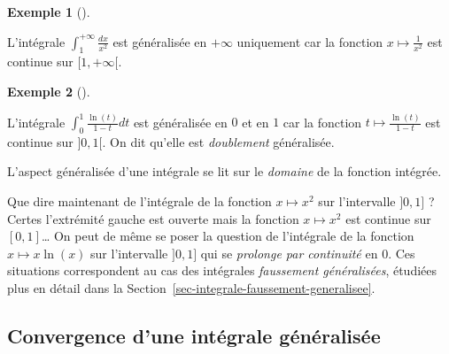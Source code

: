 \documentclass[
  french,
  letterpaper,
  DIV=11,
  numbers=noendperiod]{scrreprt}
\theoremstyle{plain}
\theoremstyle{definition}
\theoremstyle{plain}
\theoremstyle{plain}
\theoremstyle{definition}
\theoremstyle{definition}
\newtheorem{example}{Exemple}[chapter]
\theoremstyle{plain}
\theoremstyle{remark}
\begin{document}
\begin{example}[]\protect\hypertarget{exm-simplement-generalisee-1}{}\label{exm-simplement-generalisee-1}

L'intégrale \(\int_{1}^{+\infty}\frac{dx}{x^2}\) est généralisée en
\(+\infty\) uniquement car la fonction \(x \mapsto \frac{1}{x^{2}}\) est
continue sur \([1,+\infty[\).

\end{example}

\begin{example}[]\protect\hypertarget{exm-simplement-generalisee-3}{}\label{exm-simplement-generalisee-3}

L'intégrale \(\int_{0}^{1}\frac{\ln(t)}{1-t}dt\) est généralisée en
\(0\) et en \(1\) car la fonction \(t \mapsto \frac{\ln(t)}{1-t}\) est
continue sur \(]0,1[\). On dit qu'elle est \emph{doublement}
généralisée.

\end{example}

\begin{tcolorbox}[enhanced jigsaw, arc=.35mm, bottomrule=.15mm, bottomtitle=1mm, breakable, colback=white, colbacktitle=quarto-callout-tip-color!10!white, colframe=quarto-callout-tip-color-frame, coltitle=black, left=2mm, leftrule=.75mm, opacityback=0, opacitybacktitle=0.6, rightrule=.15mm, title=\textcolor{quarto-callout-tip-color}{\faLightbulb}\hspace{0.5em}{Astuce}, titlerule=0mm, toprule=.15mm, toptitle=1mm]

L'aspect généralisée d'une intégrale se lit sur le \emph{domaine} de la
fonction intégrée.

\end{tcolorbox}

Que dire maintenant de l'intégrale de la fonction \(x \mapsto x^{2}\)
sur l'intervalle \(]0,1]\) ? Certes l'extrémité gauche est ouverte mais
la fonction \(x
\mapsto x^{2}\) est continue sur \([0,1]\)\ldots{} On peut de même se
poser la question de l'intégrale de la fonction \(x \mapsto x\ln(x)\)
sur l'intervalle \(]0,1]\) qui se \emph{prolonge par continuité} en
\(0\). Ces situations correspondent au cas des intégrales
\emph{faussement généralisées}, étudiées plus en détail dans la
Section~\ref{sec-integrale-faussement-generalisee}.

\subsection{Convergence d'une intégrale
généralisée}\label{convergence-dune-intuxe9grale-guxe9nuxe9ralisuxe9e}
\end{document}
